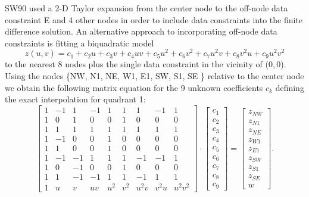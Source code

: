 \documentclass[12pt,letterpaper,margin=0.5in]{article}
\begin{document}
SW90 used a 2-D Taylor expansion from the center node to the off-node data constraint E
and 4 other nodes in order to include data constraints into the finite difference solution.
An alternative approach to incorporating off-node data constraints is fitting a biquadratic model
\begin{equation}
	z(u,v) = c_1 + c_2 u + c_3 v + c_4 u v + c_5 u^2 + c_6 v^2 + c_7 u^2v + c_8 v^2 u + c_9 u^2v^2
	\label{eq:biquadratic}
\end{equation}
to the nearest 8 nodes plus the single data constraint in the vicinity of ($0,0$).  Using the nodes 
\{NW, N1, NE, W1, E1, SW, S1, SE \} relative to the center node we obtain the following matrix equation
for the 9 unknown coefficients $c_k$ defining the exact interpolation for quadrant 1:
\begin{equation}
\left[ {\begin{array}{*{20}{c}}
1&{ - 1}&1&{ - 1}&1&1&1&{ - 1}&1\\
1&0&1&0&0&1&0&0&0\\
1&1&1&1&1&1&1&1&1\\
1&{ - 1}&0&0&1&0&0&0&0\\
1&1&0&0&1&0&0&0&0\\
1&{ - 1}&{ - 1}&1&1&1&{ - 1}&{ - 1}&1\\
1&0&{ - 1}&0&0&1&0&0&0\\
1&1&{ - 1}&{ - 1}&1&1&{ - 1}&1&1\\
1&u&v&{uv}&{{u^2}}&{{v^2}}&{{u^2}v}&{{v^2}u}&{{u^2}{v^2}}
\end{array}} \right] \cdot \left[ {\begin{array}{*{20}{c}}
{{c_1}}\\
{{c_2}}\\
{{c_3}}\\
{{c_4}}\\
{{c_5}}\\
{{c_6}}\\
{{c_7}}\\
{{c_8}}\\
{{c_9}}
\end{array}} \right] = \left[ {\begin{array}{*{20}{c}}
{{z_{NW}}}\\
{{z_{N1}}}\\
{{z_{NE}}}\\
{{z_{W1}}}\\
{{z_{E1}}}\\
{{z_{SW}}}\\
{{z_{S1}}}\\
{{z_{SE}}}\\
w
\end{array}} \right].
\end{equation}
\end{document}
